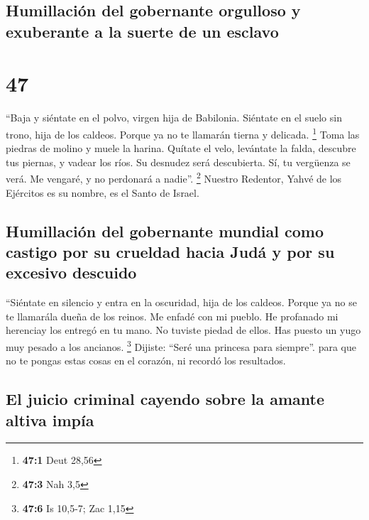 \hypertarget{humillaciuxf3n-del-gobernante-orgulloso-y-exuberante-a-la-suerte-de-un-esclavo}{%
\subsection{Humillación del gobernante orgulloso y exuberante a la
suerte de un
esclavo}\label{humillaciuxf3n-del-gobernante-orgulloso-y-exuberante-a-la-suerte-de-un-esclavo}}

\hypertarget{section-46}{%
\section{47}\label{section-46}}

 ``Baja y siéntate en el polvo, virgen hija de Babilonia.
Siéntate en el suelo sin trono, hija de los caldeos. Porque ya no te
llamarán tierna y delicada. \footnote{\textbf{47:1} Deut 28,56}
 Toma las piedras de molino y muele la harina. Quítate el
velo, levántate la falda, descubre tus piernas, y vadear los ríos.
 Su desnudez será descubierta. Sí, tu vergüenza se verá.
Me vengaré, y no perdonará a nadie''. \footnote{\textbf{47:3} Nah 3,5}
 Nuestro Redentor, Yahvé de los Ejércitos es su nombre, es
el Santo de Israel.

\hypertarget{humillaciuxf3n-del-gobernante-mundial-como-castigo-por-su-crueldad-hacia-juduxe1-y-por-su-excesivo-descuido}{%
\subsection{Humillación del gobernante mundial como castigo por su
crueldad hacia Judá y por su excesivo
descuido}\label{humillaciuxf3n-del-gobernante-mundial-como-castigo-por-su-crueldad-hacia-juduxe1-y-por-su-excesivo-descuido}}

 ``Siéntate en silencio y entra en la oscuridad, hija de
los caldeos. Porque ya no se te llamarála dueña de los reinos.
 Me enfadé con mi pueblo. He profanado mi herenciay los
entregó en tu mano. No tuviste piedad de ellos. Has puesto un yugo muy
pesado a los ancianos. \footnote{\textbf{47:6} Is 10,5-7; Zac 1,15}
 Dijiste: ``Seré una princesa para siempre''. para que no
te pongas estas cosas en el corazón, ni recordó los resultados.

\hypertarget{el-juicio-criminal-cayendo-sobre-la-amante-altiva-impuxeda}{%
\subsection{El juicio criminal cayendo sobre la amante altiva
impía}\label{el-juicio-criminal-cayendo-sobre-la-amante-altiva-impuxeda}}

